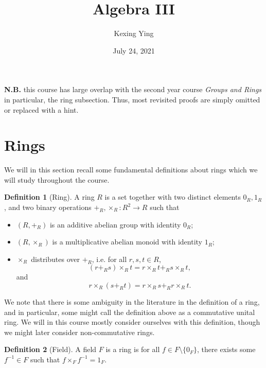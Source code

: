 \documentclass[]{article}
\title{Algebra III}
\author{Kexing Ying}
\date{July 24, 2021}
\theoremstyle{definition}
\theoremstyle{definition}
\newtheorem{definition}{Definition}[section]
\begin{document}
\maketitle

\begin{center}
  \begin{minipage}{.75\textwidth}
    \textbf{N.B.} this course has large overlap with the second year course 
    \textit{Groups and Rings} in particular, the ring subsection. Thus, 
    most revisited proofs are simply omitted or replaced with a hint.
  \end{minipage}
\end{center}

{
\hypersetup{linkcolor=}
\setcounter{tocdepth}{2}
\tableofcontents
}
\newpage

\section{Rings}

We will in this section recall some fundamental definitions about rings which 
we will study throughout the course.

\begin{definition}[Ring]
  A ring \(R\) is a set together with two distinct elements \(0_R, 1_R\), and 
  two binary operations \(+_R, \times_R : R^2 \to R\) such that 
  \begin{itemize}
    \item \((R, +_R)\) is an additive abelian group with identity \(0_R\);
    \item \((R, \times_R)\) is a multiplicative abelian monoid with identity \(1_R\);
    \item \(\times_R\) distributes over \(+_R\), i.e. for all \(r, s, t \in R\), 
      \[(r +_R s) \times_R t = r \times_R t +_R s \times_R t,\] and 
      \[r \times_R (s +_R t) = r \times_R s +_R r \times_R t.\]
  \end{itemize}
\end{definition}

We note that there is some ambiguity in the literature in the definition of a 
ring, and in particular, some might call the definition above as a commutative 
unital ring. We will in this course mostly consider ourselves with this definition, 
though we might later consider non-commutative rings.

\begin{definition}[Field]
  A field \(F\) is a ring is for all \(f \in F \setminus \{0_F\}\), there 
  exists some \(f^{-1} \in F\) such that \(f \times_F f^{-1} = 1_F\).
\end{definition}
\end{document}
